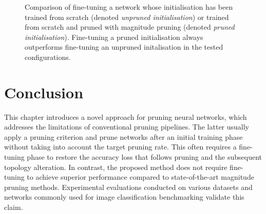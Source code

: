 \begin{figure}
  \caption{ Comparison of fine-tuning a network whose initialisation has been
    trained from scratch (denoted \emph{unpruned initialisation}) or trained from
    scratch and pruned with magnitude pruning (denoted \emph{pruned
      initialisation}). Fine-tuning a pruned initialisation always outperforms
    fine-tuning an unpruned initalisation in the tested configurations.}
  \label{fig:chap1:finetuning_with_init_not_pruned}

\end{figure}




\section{Conclusion}
\label{sec:chap1:conclusion}


This chapter introduces a novel approach for pruning neural networks, which
addresses the limitations of conventional pruning pipelines. The latter usually
apply a pruning criterion and prune networks after an initial training phase
without taking into account the target pruning rate. This often requires a
fine-tuning phase to restore the accuracy loss that follows pruning and the
subsequent topology alteration. In contrast, the proposed method does not
require fine-tuning to achieve superior performance compared to state-of-the-art
magnitude pruning methods. Experimental evaluations conducted on various
datasets and networks commonly used for image classification benchmarking
validate this claim.\\

